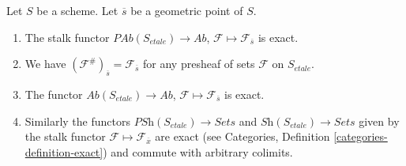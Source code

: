 \begin{lemma}
\label{lemma-stalk-exact}
Let $S$ be a scheme. Let $\overline{s}$ be a geometric point of $S$.
\begin{enumerate}
\item The stalk functor
$\textit{PAb}(S_{etale}) \to \textit{Ab}$,
$\mathcal{F}  \mapsto  \mathcal{F}_{\overline{s}}$
is exact.
\item We have $(\mathcal{F}^\#)_{\overline{s}} = \mathcal{F}_{\overline{s}}$
for any presheaf of sets $\mathcal{F}$ on $S_{etale}$.
\item The functor
$\textit{Ab}(S_{etale}) \to \textit{Ab}$,
$\mathcal{F} \mapsto \mathcal{F}_{\overline{s}}$ is exact.
\item Similarly the functors
$\textit{PSh}(S_{etale}) \to \textit{Sets}$ and
$\textit{Sh}(S_{etale}) \to \textit{Sets}$ given by the stalk functor
$\mathcal{F} \mapsto \mathcal{F}_{\overline{x}}$ are exact (see
Categories, Definition \ref{categories-definition-exact})
and commute with arbitrary colimits.
\end{enumerate}
\end{lemma}

